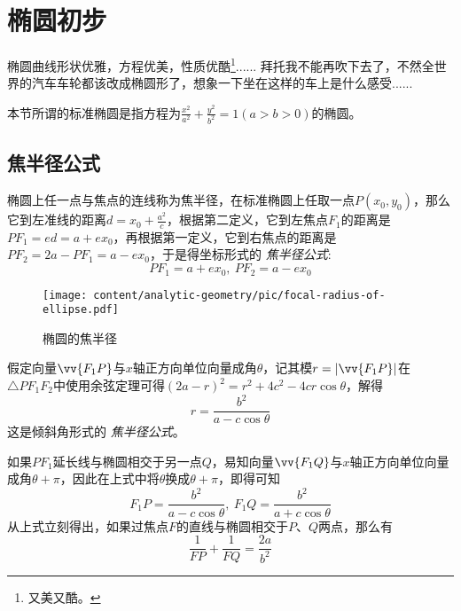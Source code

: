
\section{椭圆初步}
\label{sec:oval-preliminary-discussion}

椭圆曲线形状优雅，方程优美，性质优酷\footnote{又美又酷。}...... 拜托我不能再吹下去了，不然全世界的汽车车轮都该改成椭圆形了，想象一下坐在这样的车上是什么感受......

本节所谓的标准椭圆是指方程为$\frac{x^2}{a^2}+\frac{y^2}{b^2}=1(a>b>0)$的椭圆。

\subsection{焦半径公式}
\label{sec:oval-focal-radius}

椭圆上任一点与焦点的连线称为焦半径，在标准椭圆上任取一点$P(x_0,y_0)$，那么它到左准线的距离$d=x_0+\frac{a^2}{c}$，根据第二定义，它到左焦点$F_1$的距离是$PF_1=ed=a+ex_0$，再根据第一定义，它到右焦点的距离是$PF_2=2a-PF_1=a-ex_0$，于是得坐标形式的 \emph{焦半径公式}:
\begin{equation}
  \label{eq:oval-focal-radius-in-xy}
  PF_1=a+ex_0, \  PF_2=a-ex_0
\end{equation}

\begin{figure}[htbp]
  \centering
\texttt{[image: content/analytic-geometry/pic/focal-radius-of-ellipse.pdf]}
\caption{椭圆的焦半径}
\label{fig:focal-radius-of-ellipse}
\end{figure}

假定向量$\vv{F_1P}$与$x$轴正方向单位向量成角$\theta$，记其模$r=|\vv{F_1P}|$在$\triangle PF_1F_2$中使用余弦定理可得$(2a-r)^2=r^2+4c^2-4cr\cos{\theta}$，解得
\begin{equation}
  \label{eq:oval-focal-radius-theta}
  r=\frac{b^2}{a-c\cos{\theta}}
\end{equation}
这是倾斜角形式的 \emph{焦半径公式}。

\begin{example}
 如果$PF_1$延长线与椭圆相交于另一点$Q$，易知向量$\vv{F_1Q}$与$x$轴正方向单位向量成角$\theta+\pi$，因此在上式中将$\theta$换成$\theta+\pi$，即得可知
\begin{equation}
  \label{eq:oval-focal-radius-theta-2}
  F_1P=\frac{b^2}{a-c\cos{\theta}}, \  F_1Q=\frac{b^2}{a+c\cos{\theta}}
\end{equation}
从上式立刻得出，如果过焦点$F$的直线与椭圆相交于$P$、$Q$两点，那么有
\begin{equation}
  \label{eq:oval-focal-line-split}
  \frac{1}{FP}+\frac{1}{FQ}=\frac{2a}{b^2}
\end{equation}
\end{example}

